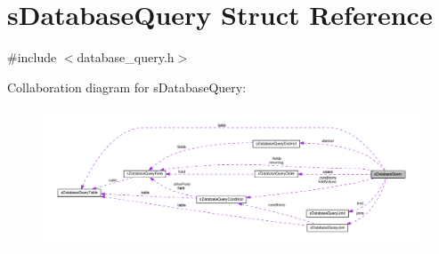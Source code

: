 \hypertarget{structsDatabaseQuery}{}\section{s\+Database\+Query Struct Reference}
\label{structsDatabaseQuery}


{\ttfamily \#include $<$database\+\_\+query.\+h$>$}



Collaboration diagram for s\+Database\+Query\+:\nopagebreak
\begin{figure}[H]
\begin{center}
\leavevmode
\includegraphics[width=350pt]{structsDatabaseQuery__coll__graph}
\end{center}
\end{figure}
